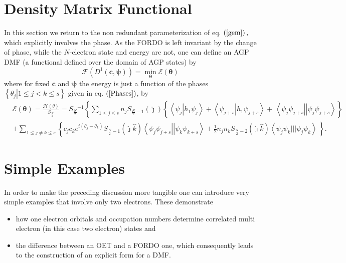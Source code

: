 \documentclass[aps,preprint]{revtex4}%
\begin{document}
\section{Density Matrix Functional\label{DenMatFun}}

In this section we return to the non redundant parameterization of eq.
$\left(  \ref{gem}\right)  ,$which explicitly involves the phase. As the FORDO
is left invariant by the change of phase, while the $N$-electron state and
energy are not, one can define an AGP DMF (a functional defined over the
domain of AGP states) by%
\begin{equation}
\mathcal{F}\left(  D^{1}\left(  \bm{c},\bm{\psi}\right)  \right)
=\min_{\bm{\theta}}\mathcal{E}\left(  \bm{\theta}\right)
\end{equation}
where for fixed $\bm{c}$ and $\bm{\psi}$ the energy is just a function of the
phases $\left\{  \left.  \theta_{j}\right\vert 1\leq j<k\leq s\right\}  $
given in eq. $\left(  \ref{Phases}\right)  $, by
\begin{align}
&  \mathcal{E}\left(  \bm{\theta}\right)  =\frac{\mathcal{H}\left(
\theta\right)  }{S_{\frac{N}{2}}}=S_{\frac{N}{2}}{}^{-1}\left\{  \sum_{1\leq
j\leq s}n_{j}S_{\frac{N}{2}-1}\left(  \hat{\jmath}\right)  \left\{  \overset
{}{\left\langle \psi_{j}\left\vert h_{1}\psi_{j}\right.  \right\rangle
+\left\langle \psi_{j+s}\left\vert h_{1}\psi_{j+s}\right.  \right\rangle
}+\,\left\langle \psi_{j}\psi_{j+s}\right\vert \left\vert \psi_{j}\psi
_{j+s}\right\rangle \right\}  \right. \nonumber\\
&  +\sum_{1\leq j\neq k\leq s}\left\{  c_{j}c_{k}e^{i\left(  \theta_{j}%
-\theta_{k}\right)  }S_{\frac{N}{2}-1}\left(  \hat{\jmath}\hat{k}\right)
\left\langle \psi_{j}\psi_{j+s}\right\vert \left\vert \psi_{k}\psi
_{k+s}\right\rangle +\frac{1}{2}n_{j}n_{k}S_{\frac{N}{2}-2}\left(  \hat
{\jmath}\hat{k}\right)  \left\langle \psi_{j}\psi_{k}|||\psi_{j}\psi
_{k}\right\rangle \,\overset{}{}\right\}  .
\end{align}


\section{Simple Examples}

In order to make the preceding discussion more tangible one can introduce very
simple examples that involve only two electrons. These demonstrate

\begin{itemize}
\item how one electron orbitals and occupation numbers determine correlated
multi electron (in this case two electron) states and

\item the difference between an OET and a FORDO one, which consequently leads
to the construction of an explicit form for a DMF.
\end{itemize}
\end{document}
